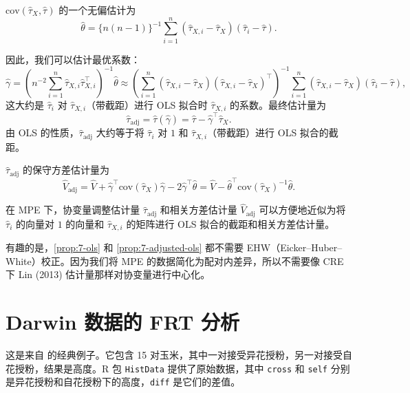 \begin{Theorem}[协方差的无偏估计]\label{th:7-cov-estimate}
$\text{cov}(\hat\tau_X, \hat\tau)$ 的一个无偏估计为
\begin{equation}
\hat\theta = \{n(n-1)\}^{-1} \sum_{i=1}^n (\hat\tau_{X,i} - \hat\tau_X)(\hat\tau_i - \hat\tau).
\label{eq:7-cov-estimator}
\end{equation}
\end{Theorem}

因此，我们可以估计最优系数：
\[
\hat\gamma = \left(n^{-2} \sum_{i=1}^n \hat\tau_{X,i} \hat\tau_{X,i}^\top\right)^{-1} \hat\theta \approx \left(\sum_{i=1}^n (\hat\tau_{X,i} - \hat\tau_X)(\hat\tau_{X,i} - \hat\tau_X)^\top\right)^{-1} \sum_{i=1}^n (\hat\tau_{X,i} - \hat\tau_X)(\hat\tau_i - \hat\tau),
\]
这大约是 $\hat\tau_i$ 对 $\hat\tau_{X,i}$（带截距）进行 OLS 拟合时 $\hat\tau_{X,i}$ 的系数。最终估计量为
\begin{equation}
\hat\tau_{\text{adj}} = \hat\tau(\hat\gamma) = \hat\tau - \hat\gamma^\top \hat\tau_X.
\label{eq:7-final-adjusted}
\end{equation}
由 OLS 的性质，$\hat\tau_{\text{adj}}$ 大约等于将 $\hat\tau_i$ 对 $1$ 和 $\hat\tau_{X,i}$（带截距）进行 OLS 拟合的截距。

$\hat\tau_{\text{adj}}$ 的保守方差估计量为
\[
\hat V_{\text{adj}} = \hat V + \hat\gamma^\top \text{cov}(\hat\tau_X) \hat\gamma - 2\hat\gamma^\top \hat\theta = \hat V - \hat\theta^\top \text{cov}(\hat\tau_X)^{-1} \hat\theta.
\]

\begin{Proposition}\label{prop:7-adjusted-ols}
在 MPE 下，协变量调整估计量 $\hat\tau_{\text{adj}}$ 和相关方差估计量 $\hat V_{\text{adj}}$ 可以方便地近似为将 $\hat\tau_i$ 的向量对 $1$ 的向量和 $\hat\tau_{X,i}$ 的矩阵进行 OLS 拟合的截距和相关方差估计量。
\end{Proposition}

有趣的是，\cref{prop:7-ols} 和 \cref{prop:7-adjusted-ols} 都不需要 EHW（Eicker--Huber--White）校正。因为我们将 MPE 的数据简化为配对内差异，所以不需要像 CRE 下 Lin (2013) 估计量那样对协变量进行中心化。

\section{Darwin 数据的 FRT 分析}\label{sec:7-example-darwin}

这是来自 \citet{Fisher:1935} 的经典例子。它包含 15 对玉米，其中一对接受异花授粉，另一对接受自花授粉，结果是高度。R 包 \texttt{HistData} 提供了原始数据，其中 \texttt{cross} 和 \texttt{self} 分别是异花授粉和自花授粉下的高度，\texttt{diff} 是它们的差值。

